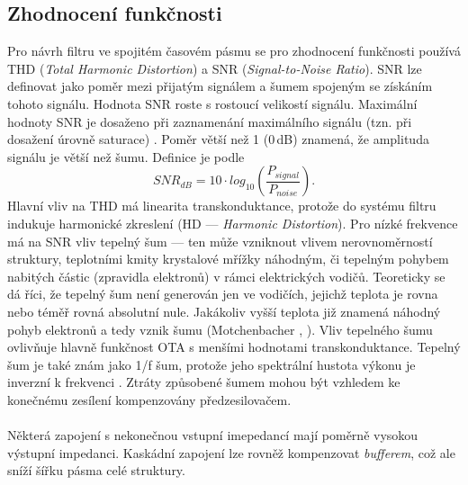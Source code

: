 \subsection{Zhodnocení funkčnosti}
\noindent Pro návrh filtru ve spojitém časovém  pásmu se pro zhodnocení funkčnosti používá THD (\textit{Total Harmonic Distortion}) a SNR (\textit{Signal-to-Noise Ratio}). SNR lze definovat jako poměr mezi přijatým signálem a šumem spojeným se získáním tohoto signálu. Hodnota SNR roste s rostoucí velikostí signálu. Maximální hodnoty SNR je dosaženo při zaznamenání maximálního signálu (tzn. při dosažení úrovně saturace) \cite{21}. Poměr větší než 1 (0\,dB) znamená, že amplituda signálu je větší než šumu. Definice je podle \cite{22}
\begin{equation}
SNR_{dB} = 10 \cdot log_{10}\left(\frac{P_{signal}}{P_{noise}}\right).
\end{equation}
 Hlavní vliv na THD má linearita transkonduktance, protože do systému filtru indukuje harmonické zkreslení (HD --- \textit{Harmonic Distortion}). Pro nízké frekvence má na SNR vliv tepelný šum --- ten může vzniknout vlivem nerovnoměrností struktury, teplotními kmity krystalové mřížky náhodným, či tepelným pohybem nabitých částic (zpravidla elektronů) v rámci elektrických vodičů. Teoreticky se dá říci, že tepelný šum není generován jen ve vodičích, jejichž teplota je rovna nebo téměř rovná absolutní nule. Jakákoliv vyšší teplota již znamená náhodný pohyb elektronů a tedy vznik šumu (Motchenbacher \cite{23}, \cite{24}). Vliv tepelného šumu ovlivňuje hlavně funkčnost OTA s menšími hodnotami transkonduktance. Tepelný šum je také znám jako 1/f šum, protože jeho spektrální hustota výkonu je inverzní k frekvenci \cite{1}. Ztráty způsobené šumem mohou být vzhledem ke konečnému zesílení kompenzovány předzesilovačem. \\
\\
Některá zapojení s nekonečnou vstupní imepedancí mají poměrně vysokou výstupní impedanci. Kaskádní zapojení lze rovněž kompenzovat \textit{bufferem}, což ale sníží šířku pásma celé struktury.\\